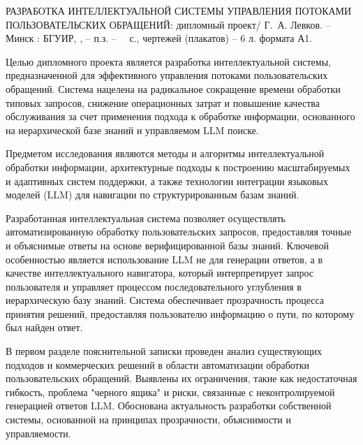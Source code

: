 \thispagestyle{empty}

\MakeUppercase{Разработка интеллектуальной системы управления потоками пользовательских обращений}: дипломный проект/ Г.~А. Левков. -- Минск : БГУИР, \the\year{}, -- п.з. -- ~\pageref*{LastPage}~с., чертежей (плакатов) -- 6 л. формата А1.

\vspace{4\parsep}


Целью дипломного проекта является разработка интеллектуальной системы, предназначенной для эффективного управления потоками пользовательских обращений. Система нацелена на радикальное сокращение времени обработки типовых запросов, снижение операционных затрат и повышение качества обслуживания за счет применения подхода к обработке информации, основанного на иерархической базе знаний и управляемом LLM поиске.

Предметом исследования являются методы и алгоритмы интеллектуальной обработки информации, архитектурные подходы к построению масштабируемых и адаптивных систем поддержки, а также технологии интеграции языковых моделей (LLM) для навигации по структурированным базам знаний.

Разработанная интеллектуальная система позволяет осуществлять автоматизированную обработку пользовательских запросов, предоставляя точные и объяснимые ответы на основе верифицированной базы знаний. Ключевой особенностью является использование LLM не для генерации ответов, а в качестве интеллектуального навигатора, который интерпретирует запрос пользователя и управляет процессом последовательного углубления в иерархическую базу знаний. Система обеспечивает прозрачность процесса принятия решений, предоставляя пользователю информацию о пути, по которому был найден ответ.

В первом разделе пояснительной записки проведен анализ существующих подходов и коммерческих решений в области автоматизации обработки пользовательских обращений. Выявлены их ограничения, такие как недостаточная гибкость, проблема "черного ящика" и риски, связанные с неконтролируемой генерацией ответов LLM. Обоснована актуальность разработки собственной системы, основанной на принципах прозрачности, объяснимости и управляемости.

